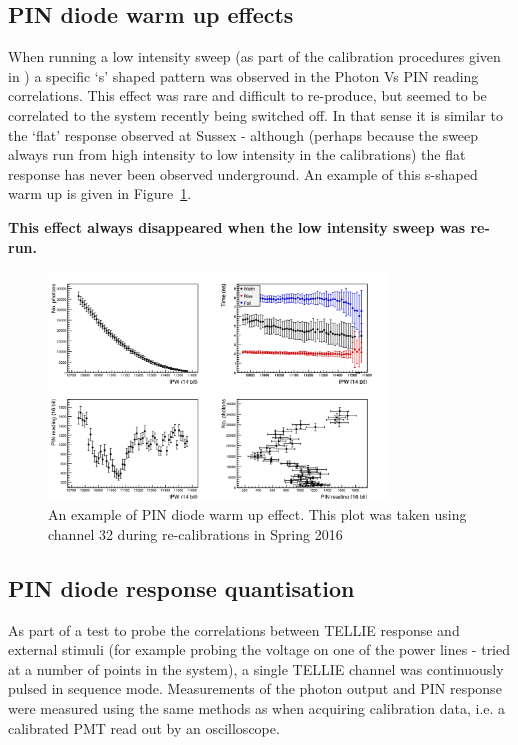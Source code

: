 \documentclass[12pt]{report}
\begin{document}
\subsection{PIN diode warm up effects}
When running a low intensity sweep (as part of the calibration procedures given in \cite{tellieCalibProceedures}) a specific `s' shaped pattern was observed in the Photon Vs PIN reading correlations. This effect was rare and difficult to re-produce, but seemed to be correlated to the system recently being switched off. In that sense it is similar to the `flat' response observed at Sussex - although (perhaps because the sweep always run from high intensity to low intensity in the calibrations) the flat response has never been observed underground. An example of this s-shaped warm up is given in Figure~\ref{fig:PINWarmUp}.

\textbf{This effect always disappeared when the low intensity sweep was re-run.}

\begin{figure}[htp]
	\begin{center}
		\includegraphics[width=0.8\textwidth]{PINWarmUp}
		\caption{An example of PIN diode warm up effect. This plot was taken using channel 32 during re-calibrations in Spring 2016}
		\label{fig:PINWarmUp}
	\end{center}
\end{figure}

\subsection{PIN diode response quantisation}
As part of a test to probe the correlations between TELLIE response and external stimuli (for example probing the voltage on one of the power lines - tried at a number of points in the system), a single TELLIE channel was continuously pulsed in sequence mode. Measurements of the photon output and PIN response were measured using the same methods as when acquiring calibration data, i.e. a calibrated PMT read out by an oscilloscope. 
\end{document}
